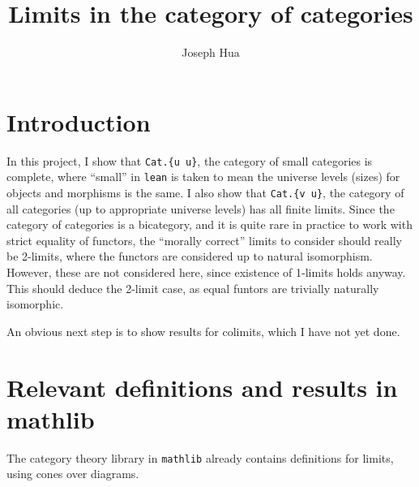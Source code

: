 \documentclass{article}
\newcommand{\<}{\langle}
\renewcommand{\>}{\rangle}
\theoremstyle{definitionstyle}
\theoremstyle{exercisestyle}
\theoremstyle{remarkstyle}
\begin{document}
\title{Limits in the category of categories}
\author{Joseph Hua}
\maketitle


\section{Introduction}

In this project, I show that \texttt{Cat.\{u u\}}, the category of small categories
is complete, where ``small'' in \texttt{lean} is taken to mean
the universe levels (sizes) for objects and morphisms is the same.
I also show that \texttt{Cat.\{v u\}}, the category of all categories
(up to appropriate universe levels) has all finite limits.
Since the category of categories is a bicategory,
and it is quite rare in practice to work with strict equality of functors,
the ``morally correct'' limits to consider should really be 2-limits,
where the functors are considered up to natural isomorphism.
However, these are not considered here, since existence of 1-limits holds anyway.
This should deduce the 2-limit case, as equal funtors are trivially naturally isomorphic.

An obvious next step is to show results for colimits, which I have not yet done.

\section{Relevant definitions and results in mathlib}

The category theory library in \texttt{mathlib} already contains definitions for
limits, using cones over diagrams.
\end{document}
